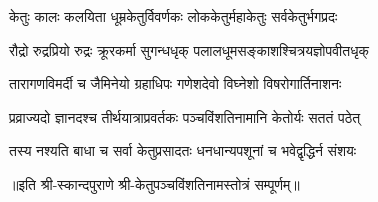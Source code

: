 

\twolineshloka
{केतुः कालः कलयिता धूम्रकेतुर्विवर्णकः}
{लोककेतुर्महाकेतुः सर्वकेतुर्भगप्रदः}

\twolineshloka
{रौद्रो रुद्रप्रियो रुद्रः क्रूरकर्मा सुगन्धधृक्}
{पलालधूमसङ्काशश्चित्रयज्ञोपवीतधृक्}

\twolineshloka
{तारागणविमर्दी च जैमिनेयो ग्रहाधिपः}
{गणेशदेवो विघ्नेशो विषरोगार्तिनाशनः}

\twolineshloka
{प्रव्राज्यदो ज्ञानदश्च तीर्थयात्राप्रवर्तकः}
{पञ्चविंशतिनामानि केतोर्यः सततं पठेत्}

\twolineshloka
{तस्य नश्यति बाधा च सर्वा केतुप्रसादतः}
{धनधान्यपशूनां च भवेद्वृद्धिर्न संशयः}

॥इति श्री-स्कान्दपुराणे श्री-केतुपञ्चविंशतिनामस्तोत्रं सम्पूर्णम्॥


